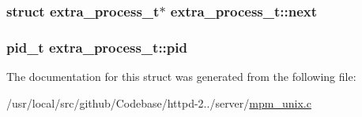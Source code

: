 \subsubsection[{\texorpdfstring{next}{next}}]{\setlength{\rightskip}{0pt plus 5cm}struct {\bf extra\+\_\+process\+\_\+t}$\ast$ extra\+\_\+process\+\_\+t\+::next}\hypertarget{structextra__process__t_a9ab6ede07845f95dd38aed1046f26ae8}{}\label{structextra__process__t_a9ab6ede07845f95dd38aed1046f26ae8}
\subsubsection[{\texorpdfstring{pid}{pid}}]{\setlength{\rightskip}{0pt plus 5cm}pid\+\_\+t extra\+\_\+process\+\_\+t\+::pid}\hypertarget{structextra__process__t_a25f32fb330757ed1d127e7e5daa40169}{}\label{structextra__process__t_a25f32fb330757ed1d127e7e5daa40169}


The documentation for this struct was generated from the following file\+:\begin{DoxyCompactItemize}
\item 
/usr/local/src/github/\+Codebase/httpd-\/2../server/\hyperlink{mpm__unix_8c}{mpm\+\_\+unix.\+c}\end{DoxyCompactItemize}

